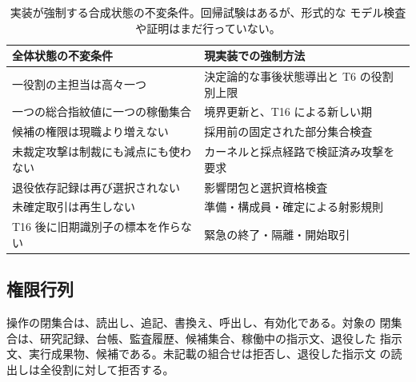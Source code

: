 \begin{table}[htbp]
  \centering
  \small
  \begin{tabularx}{\textwidth}{@{}p{}X@{}}
    \toprule
    \textbf{全体状態の不変条件} & \textbf{現実装での強制方法} \\
    \midrule
    一役割の主担当は高々一つ &
      決定論的な事後状態導出と T6 の役割別上限 \\
    一つの総合指紋値に一つの稼働集合 &
      境界更新と、T16 による新しい期 \\
    候補の権限は現職より増えない &
      採用前の固定された部分集合検査 \\
    未裁定攻撃は制裁にも減点にも使わない &
      カーネルと採点経路で検証済み攻撃を要求 \\
    退役依存記録は再び選択されない &
      影響閉包と選択資格検査 \\
    未確定取引は再生しない &
      準備・構成員・確定による射影規則 \\
    T16 後に旧期識別子の標本を作らない &
      緊急の終了・隔離・開始取引 \\
    \bottomrule
  \end{tabularx}
  \caption{実装が強制する合成状態の不変条件。回帰試験はあるが、形式的な
  モデル検査や証明はまだ行っていない。}
  \label{tab:whole-state-invariants}
\end{table}

\subsection{権限行列}\label{sec:appendix:authority}

操作の閉集合は、読出し、追記、書換え、呼出し、有効化である。対象の
閉集合は、研究記録、台帳、監査履歴、候補集合、稼働中の指示文、退役した
指示文、実行成果物、候補である。未記載の組合せは拒否し、退役した指示文
の読出しは全役割に対して拒否する。

